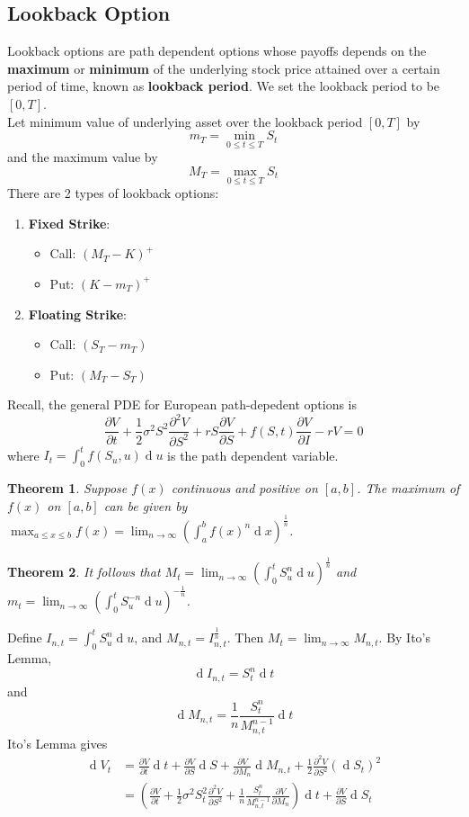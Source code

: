 \documentclass[12pt]{article}
\newtheorem{theorem}{Theorem}[section]
\theoremstyle{definition}
\DeclareMathOperator{\diff}{d}
\begin{document}
\subsection{Lookback Option}
Lookback options are path dependent options whose payoffs depends on the \textbf{maximum} or \textbf{minimum} of the underlying stock price attained over a certain period of time, known as \textbf{lookback period}. We set the lookback period to be $[0,T]$.\\
Let minimum value of underlying asset over the lookback period $[0,T]$ by
\[
m_T=\min_{0\leq t\leq T}S_t
\]
and the maximum value by
\[
M_T=\max_{0\leq t\leq T}S_t
\]
There are 2 types of lookback options:
\begin{enumerate}
	\item \textbf{Fixed Strike}:
	\begin{itemize}
		\item Call: $(M_T-K)^+$
		\item Put: $(K-m_T)^+$
	\end{itemize}
	\item \textbf{Floating Strike}:
	\begin{itemize}
		\item Call: $(S_T-m_T)$
		\item Put: $(M_T-S_T)$
	\end{itemize}
\end{enumerate}
Recall, the general PDE for European path-depedent options is
\[
\frac{\partial V}{\partial t}+\frac{1}{2}\sigma^2 S^2\frac{\partial^2 V}{\partial S^2}+rS\frac{\partial V}{\partial S}+f(S,t)\frac{\partial V}{\partial I}-rV=0
\]
where $I_t=\int_0^t f(S_u,u)\diff u$ is the path dependent variable.\\
\begin{theorem}\normalfont Suppose $f(x)$ continuous and positive on $[a,b]$. The maximum of $f(x)$ on $[a,b]$ can be given by $\max_{a\leq x\leq b}f(x)=\lim_{n\to\infty}(\int_a^b f(x)^n\diff x)^{\frac{1}{n}}$.\end{theorem}
\begin{theorem}\normalfont It follows that $M_t=\lim_{n\to\infty}(\int_0^t S_u^n\diff u)^{\frac{1}{n}}$ and $m_t=\lim_{n\to\infty}(\int_0^tS_u^{-n}\diff u)^{-\frac{1}{n}}$.\end{theorem}
Define $I_{n,t}=\int_0^tS_u^n\diff u$, and $M_{n,t}=I_{n,t}^\frac{1}{n}$. Then $M_t=\lim_{n\to\infty}M_{n,t}$. By Ito's Lemma,
\[
\diff I_{n,t}=S_t^n\diff t
\]
and
\[
\diff M_{n,t}=\frac{1}{n}\frac{S_t^n}{M_{n,t}^{n-1}}\diff t
\]
Ito's Lemma gives
\begin{align*}
\diff V_t&=\frac{\partial V}{\partial t}\diff t+\frac{\partial V}{\partial S}\diff S + \frac{\partial V}{\partial M_n}\diff M_{n,t}+\frac{1}{2}\frac{\partial^2 V}{\partial S^2}(\diff S_t)^2\\
&=(\frac{\partial V}{\partial t}+\frac{1}{2}\sigma^2S_t^2\frac{\partial^2 V}{\partial S^2}+\frac{1}{n}\frac{S_t^n}{M_{n,t}^{n-1}}\frac{\partial V}{\partial M_n})\diff t +\frac{\partial V}{\partial S}\diff S_t
\end{align*}
\end{document}
